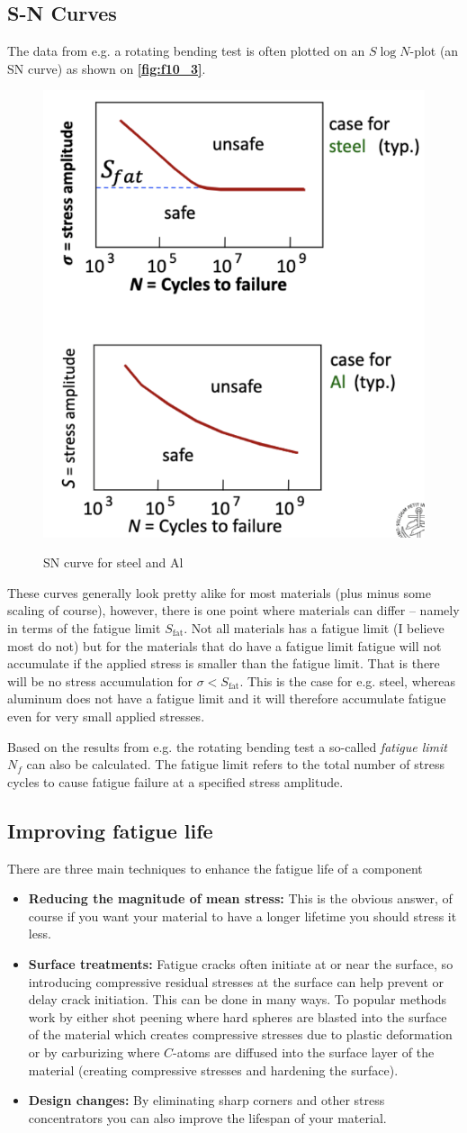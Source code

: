 \subsection{S-N Curves}
The data from e.g. a rotating bending test is often plotted on an $S \log N$-plot (an SN curve) as shown on \textbf{\autoref{fig:f10_3}}.
\begin{figure} [ht]
  \centering
  \caption{SN curve for steel and Al}
  \includegraphics[width=0.25\linewidth]{./figures/f10_3.png}
  \label{fig:f10_3}
\end{figure}
These curves generally look pretty alike for most materials (plus minus some scaling of course), however, there is one point where materials can differ -- namely in terms of the fatigue limit $S_{\mathrm{fat}}$. Not all materials has a fatigue limit (I believe  most do not) but for the materials that do have a fatigue limit fatigue will not accumulate if the applied stress is smaller than the fatigue limit. That is there will be no stress accumulation for $\sigma < S_{\mathrm{fat}}$. This is the case for e.g. steel, whereas aluminum does not have a fatigue limit and it will therefore accumulate fatigue even for very small applied stresses. 

Based on the results from e.g. the rotating bending test a so-called \textit{fatigue limit} $N_f$ can also be calculated. The fatigue limit refers to the total number of stress cycles to cause fatigue failure at a specified stress amplitude.


\subsection{Improving fatigue life}
There are three main techniques to enhance the fatigue life of a component
\begin{itemize}
  \item \textbf{Reducing the magnitude of mean stress:} This is the obvious answer, of course if you want your material to have a longer lifetime you should stress it less.
  \item \textbf{Surface treatments:} Fatigue cracks often initiate at or near the surface, so introducing compressive residual stresses at the surface can help prevent or delay crack initiation. This can be done in many ways. To popular methods work by either shot peening where hard spheres are blasted into the surface of the material which creates compressive stresses due to plastic deformation or by carburizing where $C$-atoms are diffused into the surface layer of the material (creating compressive stresses and hardening the surface).
  \item \textbf{Design changes:} By eliminating sharp corners and other stress concentrators you can also improve the lifespan of your material. 
\end{itemize}

